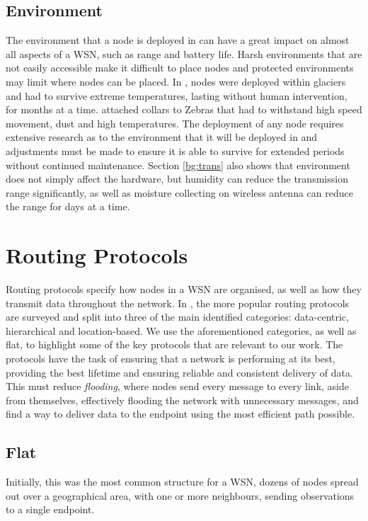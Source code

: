 \subsection{Environment}
	The environment that a node is deployed in can have a great impact on almost all aspects of a WSN, such as range and battery life. Harsh environments that are not easily accessible make it difficult to place nodes and protected environments may limit where nodes can be placed. 
	In \cite{Martinez2004}, nodes were deployed within glaciers and had to survive extreme temperatures, lasting without human intervention, for months at a time. \cite{Juang2002} attached collars to Zebras that had to withstand high speed movement, dust and high temperatures. The deployment of any node requires extensive research as to the environment that it will be deployed in and adjustments must be made to ensure it is able to survive for extended periods without continued maintenance.
	Section \ref{bg:trans} also shows that environment does not simply affect the hardware, but humidity can reduce the transmission range significantly, as well as moisture collecting on wireless antenna can reduce the range for days at a time.

\section{Routing Protocols}
	Routing protocols specify how nodes in a WSN are organised, as well as how they transmit data throughout the network. In \cite{Akkaya2005}, the more popular routing protocols are surveyed and split into three of the main identified categories: data-centric, hierarchical and location-based. We use the aforementioned categories, as well as flat, to highlight some of the key protocols that are relevant to our work.
	The protocols have the task of ensuring that a network is performing at its best, providing the best lifetime and ensuring reliable and consistent delivery of data. This must reduce \textit{flooding}, where nodes send every message to every link, aside from themselves, effectively flooding the network with unnecessary messages, and find a way to deliver data to the endpoint using the most efficient path possible.

\subsection{Flat}
	Initially, this was the most common structure for a WSN, dozens of nodes spread out over a geographical area, with one or more neighbours, sending observations to a single endpoint.

